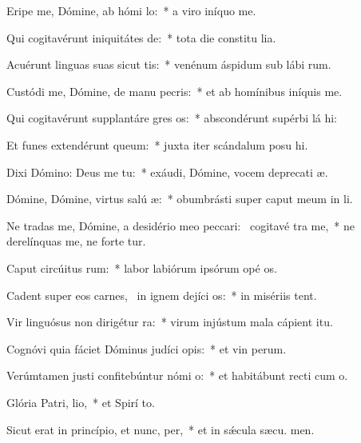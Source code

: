 \item Eripe me, Dómine, ab hómi lo:~* a viro iníquo  me.
\item Qui cogitavérunt iniquitátes  de:~* tota die constitu lia.
\item Acuérunt linguas suas sicut tis:~* venénum áspidum sub lábi rum.
\item Custódi me, Dómine, de manu pecris:~* et ab homínibus iníquis  me.
\item Qui cogitavérunt supplantáre gres os:~* abscondérunt supérbi lá hi:
\item Et funes extendérunt  queum:~* juxta iter scándalum posu hi.
\item Dixi Dómino: Deus me  tu:~* exáudi, Dómine, vocem deprecati æ.
\item Dómine, Dómine, virtus salú æ:~* obumbrásti super caput meum in  li.
\item Ne tradas me, Dómine, a desidério meo peccari:~\pscross{} cogitavé tra me,~* ne derelínquas me, ne forte tur.
\item Caput circúitus rum:~* labor labiórum ipsórum opé os.
\item Cadent super eos carnes,~\pscross{} in ignem dejíci os:~* in misériis  tent.
\item Vir linguósus non dirigétur  ra:~* virum injústum mala cápient  itu.
\item Cognóvi quia fáciet Dóminus judíci opis:~* et vin perum.
\item Verúmtamen justi confitebúntur nómi o:~* et habitábunt recti cum  o.
\item Glória Patri,  lio,~* et Spirí to.
\item Sicut erat in princípio, et nunc,  per,~* et in sǽcula sæcu. men.
